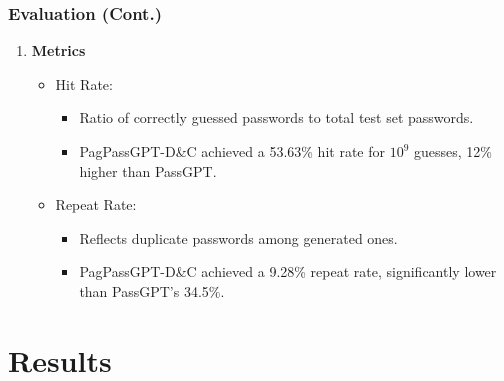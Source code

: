 \documentclass[
	12pt, %
]{beamer}
\begin{document}
\begin{frame}
	\frametitle{Evaluation (Cont.)}
	
	\begin{enumerate}
		\item \textbf{Metrics}
		\begin{itemize}
			\item Hit Rate:
			\begin{itemize}
				\item Ratio of correctly guessed passwords to total test set passwords.
				\item PagPassGPT-D\&C achieved a 53.63\% hit rate for $10^9$ guesses, 12\% higher than PassGPT.
			\end{itemize}
			
			\item Repeat Rate:
			\begin{itemize}
				\item Reflects duplicate passwords among generated ones.
				\item PagPassGPT-D\&C achieved a 9.28\% repeat rate, significantly lower than PassGPT’s 34.5\%.
			\end{itemize}
%			
%			
		\end{itemize}
	\end{enumerate}
\end{frame}









\section{Results}
\end{document}

